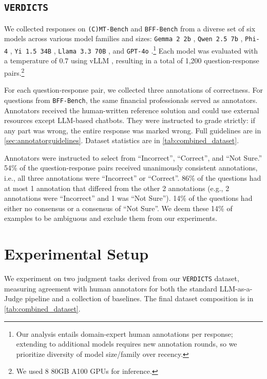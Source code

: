 \documentclass{article}
\newcommand{\judgebenchmark}{\texttt{VERDICTS}}
\newcommand{\evalbenchmark}{\texttt{BFF-Bench}}
\newcommand{\cevalbenchmark}{\texttt{(C)MT-Bench}}
\begin{document}
\subsection{\judgebenchmark{}}
We collected responses on \cevalbenchmark{} and \evalbenchmark{} from a diverse set of six models across various model families and sizes: \texttt{Gemma 2 2b} \citep{gemma2}, \texttt{Qwen 2.5 7b} \citep{qwen2.5}, \texttt{Phi-4} \citep{phi4}, \texttt{Yi 1.5 34B} \citep{yi15}, \texttt{Llama 3.3 70B} \citep{llama3}, and \texttt{GPT-4o} \citep{gpt4o}.\footnote{Our analysis entails domain-expert human annotations per response; extending to additional models requires new annotation rounds, so we prioritize diversity of model size/family over recency.} Each model was evaluated with a temperature of 0.7 using vLLM \citep{kwon2023efficient}, resulting in a total of 1,200 question-response pairs.\footnote{We used 8 80GB A100 GPUs for inference.}

For each question-response pair, we collected three annotations of correctness. For questions from \evalbenchmark{}, the same financial professionals served as annotators. Annotators received the human-written reference solution and could use external resources except LLM-based chatbots. They were instructed to grade strictly: if any part was wrong, the entire response was marked wrong. Full guidelines are in \cref{sec:annotatorguidelines}. Dataset statistics are in \cref{tab:combined_dataset}.



Annotators were instructed to select from ``Incorrect'', ``Correct'', and ``Not Sure.'' 54\% of the question-response pairs received unanimously consistent annotations, i.e., all three annotations were ``Incorrect'' or ``Correct''. 86\% of the questions had at most 1 annotation that differed from the other 2 annotations (e.g., 2 annotations were ``Incorrect'' and 1 was ``Not Sure''). 14\% of the questions had either no consensus or a consensus of ``Not Sure''. We deem these 14\% of examples to be ambiguous and exclude them from our experiments. %



\section{Experimental Setup}
\label{sec:experimental_setup}

We experiment on two judgment tasks derived from our \judgebenchmark{} dataset, measuring agreement with human annotators for both the standard LLM-as-a-Judge pipeline and a collection of baselines. The final dataset composition is in \cref{tab:combined_dataset}.
\end{document}
